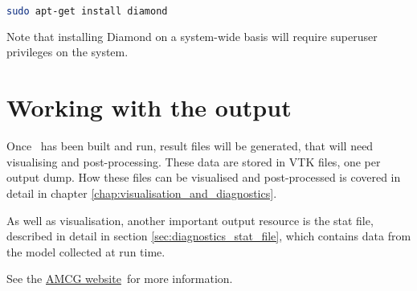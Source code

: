 \begin{lstlisting}[language=Bash]
sudo apt-get install diamond
\end{lstlisting}

Note that installing Diamond on a system-wide basis will require superuser privileges on the system.

\section{Working with the output}
\label{sec:working_with_output}

Once \fluidity\ has been built and run, result files will be generated, that
will need visualising and post-processing. These data are stored in VTK files,
one per output dump.  How these files can be visualised and post-processed is
covered in detail in chapter \ref{chap:visualisation_and_diagnostics}.

As well as visualisation, another important output resource is the stat file,
described in detail in section \ref{sec:diagnostics_stat_file}, which contains
data from the model collected at run time.

See the \href{http://amcg-www.ese.ic.ac.uk/}{AMCG website}\ for more
information.
